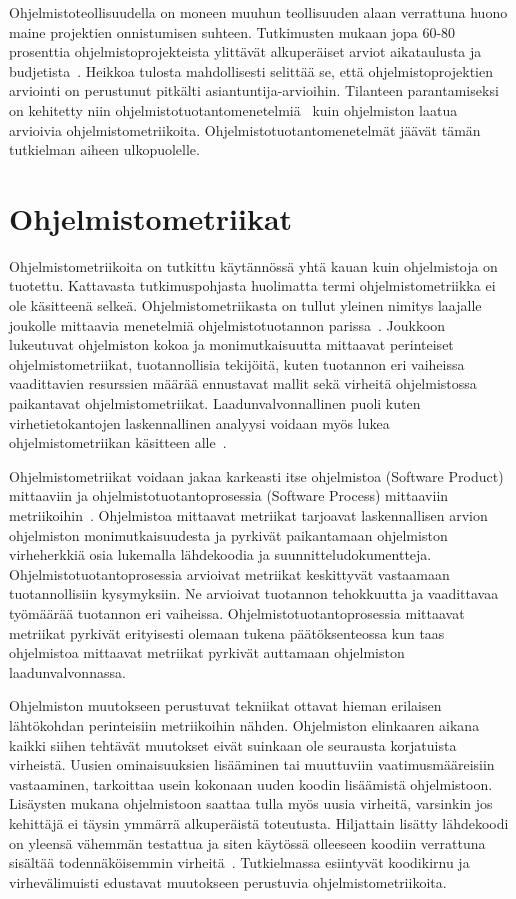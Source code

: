 \documentclass[finnish]{tktltiki2}
\theoremstyle{definition}
\theoremstyle{remark}
\begin{document}
Ohjelmistoteollisuudella on moneen muuhun teollisuuden alaan verrattuna huono maine projektien onnistumisen suhteen. Tutkimusten mukaan jopa 60-80 prosenttia ohjelmistoprojekteista ylittävät alkuperäiset arviot aikataulusta ja budjetista~\cite{MJ03}. Heikkoa tulosta mahdollisesti selittää se, että ohjelmistoprojektien arviointi on perustunut pitkälti asiantuntija-arvioihin. Tilanteen parantamiseksi on kehitetty niin ohjelmistotuotantomenetelmiä~\cite{BBB00} kuin ohjelmiston laatua arvioivia ohjelmistometriikoita. Ohjelmistotuotantomenetelmät jäävät tämän tutkielman aiheen ulkopuolelle.

\section{Ohjelmistometriikat}

Ohjelmistometriikoita on tutkittu käytännössä yhtä kauan kuin ohjelmistoja on tuotettu. Kattavasta tutkimuspohjasta huolimatta termi ohjelmistometriikka ei ole käsitteenä selkeä. Ohjelmistometriikasta on tullut yleinen nimitys laajalle joukolle mittaavia menetelmiä ohjelmistotuotannon parissa~\cite{FM00}. Joukkoon lukeutuvat ohjelmiston kokoa ja monimutkaisuutta mittaavat perinteiset ohjelmistometriikat, tuotannollisia tekijöitä, kuten tuotannon eri vaiheissa vaadittavien resurssien määrää ennustavat mallit sekä virheitä ohjelmistossa paikantavat ohjelmistometriikat. Laadunvalvonnallinen puoli kuten virhetietokantojen laskennallinen analyysi voidaan myös lukea ohjelmistometriikan käsitteen alle~\cite{FN99-2}.

Ohjelmistometriikat voidaan jakaa karkeasti itse ohjelmistoa (Software Product) mittaaviin ja ohjelmistotuotantoprosessia (Software Process) mittaaviin metriikoihin~\cite{LH93}. Ohjelmistoa mittaavat metriikat tarjoavat laskennallisen arvion ohjelmiston monimutkaisuudesta ja pyrkivät paikantamaan ohjelmiston virheherkkiä osia lukemalla lähdekoodia ja suunnitteludokumentteja. Ohjelmistotuotantoprosessia arvioivat metriikat keskittyvät vastaamaan tuotannollisiin kysymyksiin. Ne arvioivat tuotannon tehokkuutta ja vaadittavaa työmäärää tuotannon eri vaiheissa. Ohjelmistotuotantoprosessia mittaavat metriikat pyrkivät erityisesti olemaan tukena päätöksenteossa kun taas ohjelmistoa mittaavat metriikat pyrkivät auttamaan ohjelmiston laadunvalvonnassa.

Ohjelmiston muutokseen perustuvat tekniikat ottavat hieman erilaisen lähtökohdan perinteisiin metriikoihin nähden. Ohjelmiston elinkaaren aikana kaikki siihen tehtävät muutokset eivät suinkaan ole seurausta korjatuista virheistä. Uusien ominaisuuksien lisääminen tai muuttuviin vaatimusmääreisiin vastaaminen, tarkoittaa usein kokonaan uuden koodin lisäämistä ohjelmistoon. Lisäysten mukana ohjelmistoon saattaa tulla myös uusia virheitä, varsinkin jos kehittäjä ei täysin ymmärrä alkuperäistä toteutusta. Hiljattain lisätty lähdekoodi on yleensä vähemmän testattua ja siten käytössä olleeseen koodiin verrattuna sisältää todennäköisemmin virheitä~\cite{ME98}. Tutkielmassa esiintyvät koodikirnu ja virhevälimuisti edustavat muutokseen perustuvia ohjelmistometriikoita.
\end{document}
